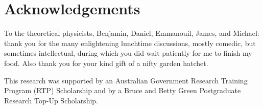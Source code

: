 \chapter{Acknowledgements}
\label{ch:acknowledgements}

To the theoretical physicists,
Benjamin, Daniel, Emmanouil, James, and Michael:
thank you for the many enlightening lunchtime discussions,
mostly comedic, but sometimes intellectual,
during which you did wait patiently for me to finish my food.
Also thank you for your kind gift of a nifty garden hatchet.

\thematicbreak

This research was supported
by an Australian Government Research Training Program (RTP) Scholarship
and by a Bruce and Betty Green Postgraduate Research Top-Up Scholarship.

